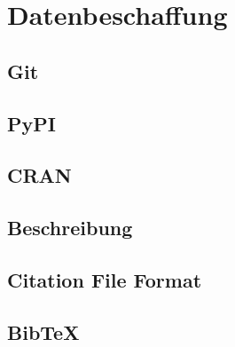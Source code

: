 \section{Datenbeschaffung}
\label{sec:datenbeschaffung}
\subsection{Git}
\label{subsec:git}
\subsection{PyPI}
\label{subsec:pypi}
\subsection{CRAN}
\label{subsec:cran}
\subsection{Beschreibung}
\label{subsec:beschreibung}
\subsection{Citation File Format}
\label{subsec:cff}
\subsection{Bib\TeX{}}
\label{subsec:bibtex_beschaffung}
